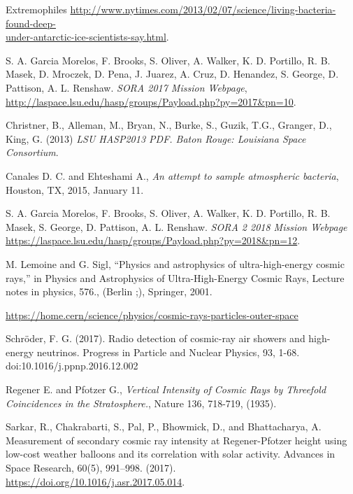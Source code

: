\newpage

\begin{thebibliography}{9}

  Extremophiles \href{http://www.nytimes.com/2013/02/07/science/living-bacteria-found-deep-under-antarctic-ice-scientists-say.html}{http://www.nytimes.com/2013/02/07/science/living-bacteria-found-deep-\\under-antarctic-ice-scientists-say.html}.

S. A. Garcia Morelos, F. Brooks, S. Oliver, A. Walker, K. D. Portillo, R. B. Masek, D. Mroczek, D. Pena, J. Juarez, A. Cruz, D. Henandez, S. George, D. Pattison, A. L. Renshaw. \textit{SORA 2017 Mission Webpage}, \url{http://laspace.lsu.edu/hasp/groups/Payload.php?py=2017&pn=10}.

  Christner, B., Alleman, M., Bryan, N., Burke, S., Guzik, T.G., Granger, D., King, G. (2013) \textit{LSU HASP2013 PDF. Baton Rouge: Louisiana Space Consortium}.

 Canales D. C. and Ehteshami A., \textit{An attempt to sample atmospheric bacteria}, Houston, TX, 2015, January 11.

S. A. Garcia Morelos, F. Brooks, S. Oliver, A. Walker, K. D. Portillo, R. B. Masek, S. George, D. Pattison, A. L. Renshaw. \textit{SORA 2 2018 Mission Webpage} \url{https://laspace.lsu.edu/hasp/groups/Payload.php?py=2018&pn=12}.

M. Lemoine and G. Sigl, “Physics and astrophysics of ultra-high-energy cosmic rays,” in
Physics and Astrophysics of Ultra-High-Energy Cosmic Rays, Lecture notes in physics, 576.,
(Berlin ;), Springer, 2001.

\url{https://home.cern/science/physics/cosmic-rays-particles-outer-space}

  Schröder, F. G. (2017). Radio detection of cosmic-ray air showers and high-energy neutrinos. Progress in Particle and Nuclear Physics, 93, 1-68. doi:10.1016/j.ppnp.2016.12.002

  Regener E. and Pfotzer G., \textit{Vertical Intensity of Cosmic Rays by Threefold Coincidences in the Stratosphere.}, Nature 136, 718-719, (1935). 

  Sarkar, R., Chakrabarti, S., Pal, P., Bhowmick, D., and Bhattacharya, A. Measurement of secondary cosmic ray intensity at Regener-Pfotzer height using low-cost weather balloons and its correlation with solar activity. Advances in Space Research, 60(5), 991–998. (2017). \url{https://doi.org/10.1016/j.asr.2017.05.014}.


\end{thebibliography}
